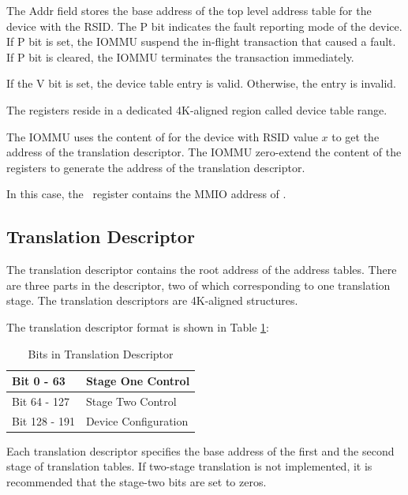 The Addr field stores the base address of the top level address table for the device with
the RSID. The P bit indicates the fault reporting mode of the device. If P bit is set, the
IOMMU suspend the in-flight transaction that caused a fault. If P bit is cleared, the
IOMMU terminates the transaction immediately. 

If the V bit is set, the device table entry is valid. Otherwise, the entry is invalid.

The \dte[$x$] registers reside in a dedicated 4K-aligned region called device table range.

The IOMMU uses the content of \dte[$x$] for the device with RSID value $x$ to get the
address of the translation descriptor. The IOMMU zero-extend the content of the \dte[$x$]
registers to generate the address of the translation descriptor.

In this case, the \dtbase\ register contains the MMIO address of \dte[$0$].

\subsection{Translation Descriptor}
\label{sec:trans_desc}

The translation descriptor contains the root address of the address tables. There are
three parts in the descriptor, two of which corresponding to one translation stage. The
translation descriptors are 4K-aligned structures.

The translation descriptor format is shown in Table \ref{tbl:dev-tbl-bits}:

\begin{table}[h!t]
    \centering
    \begin{tabular}{ | l | l | }

    \hline
    Bit 0 - 63   & Stage One Control \\
    \hline
    Bit 64 - 127 & Stage Two Control \\
    \hline
    Bit 128 - 191 & Device Configuration \\
    \hline

    \end{tabular}
    \caption{Bits in Translation Descriptor}
    \label{tbl:dev-tbl-bits}
\end{table}


Each translation descriptor specifies the base address of the first and the second stage
of translation tables. If two-stage translation is not implemented, it is recommended that
the stage-two bits are set to zeros. 

